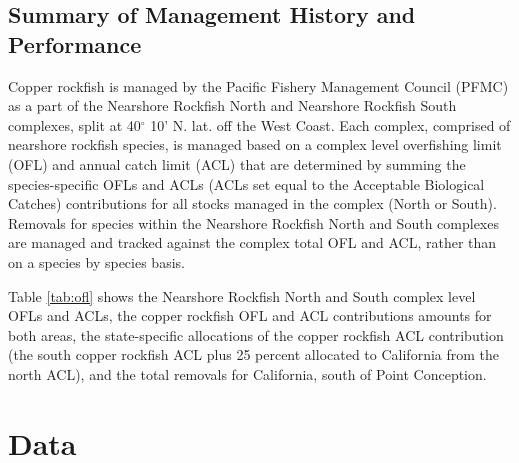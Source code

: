 \documentclass[11pt,
  english,
  a4paper,
]{article}
\begin{document}
\hypertarget{summary-of-management-history-and-performance}{%
\subsection{Summary of Management History and Performance}\label{summary-of-management-history-and-performance}}

\leavevmode\tagmcend\tagstructend


Copper rockfish is managed by the Pacific Fishery Management Council (PFMC) as a part of the Nearshore Rockfish North and Nearshore Rockfish South complexes, split at 40{\(^\circ\)\leavevmode\tagmcend\tagstructend} 10' N. lat. off the West Coast. Each complex, comprised of nearshore rockfish species, is managed based on a complex level overfishing limit (OFL) and annual catch limit (ACL) that are determined by summing the species-specific OFLs and ACLs (ACLs set equal to the Acceptable Biological Catches) contributions for all stocks managed in the complex (North or South). Removals for species within the Nearshore Rockfish North and South complexes are managed and tracked against the complex total OFL and ACL, rather than on a species by species basis.

\leavevmode\tagmcend\tagstructend\par


Table \ref{tab:ofl} shows the Nearshore Rockfish North and South complex level OFLs and ACLs, the copper rockfish OFL and ACL contributions amounts for both areas, the state-specific allocations of the copper rockfish ACL contribution (the south copper rockfish ACL plus 25 percent allocated to California from the north ACL), and the total removals for California, south of Point Conception.

\leavevmode\tagmcend\tagstructend\par


\hypertarget{data}{%
\section{Data}\label{data}}

\leavevmode\tagmcend\tagstructend

\end{document}
